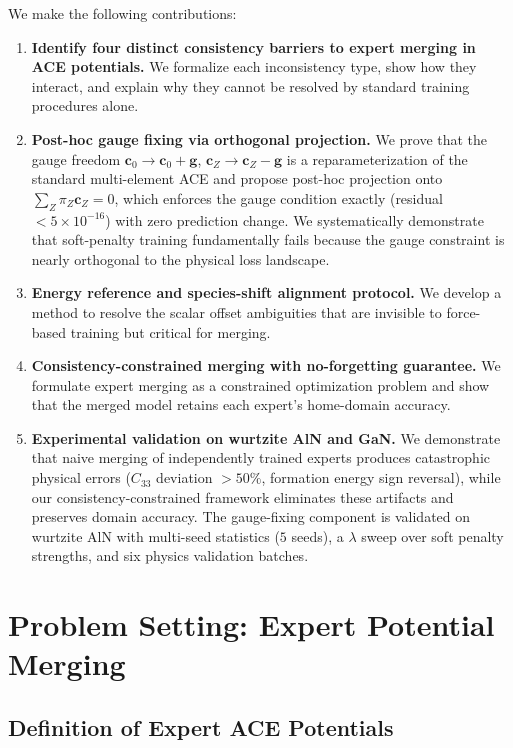\documentclass[twoside,prb,aps,floatfix,superscriptaddress,longbibliography]{revtex4-2}
\newcommand{\g}{\mathbf{g}}
\newcommand{\cZ}{\mathbf{c}_{Z}}
\newcommand{\cb}{\mathbf{c}_{0}}
\begin{document}
We make the following contributions:

\begin{enumerate}[label=\textbf{(C\arabic*)}]
    \item \textbf{Identify four distinct consistency barriers to expert merging in ACE potentials.} We formalize each inconsistency type, show how they interact, and explain why they cannot be resolved by standard training procedures alone.
    \item \textbf{Post-hoc gauge fixing via orthogonal projection.} We prove that the gauge freedom $\cb \to \cb + \g$, $\cZ \to \cZ - \g$ is a reparameterization of the standard multi-element ACE and propose post-hoc projection onto $\sum_Z \pi_Z \cZ = 0$, which enforces the gauge condition exactly (residual $< 5\times10^{-16}$) with zero prediction change. We systematically demonstrate that soft-penalty training fundamentally fails because the gauge constraint is nearly orthogonal to the physical loss landscape.
    \item \textbf{Energy reference and species-shift alignment protocol.} We develop a method to resolve the scalar offset ambiguities that are invisible to force-based training but critical for merging.
    \item \textbf{Consistency-constrained merging with no-forgetting guarantee.} We formulate expert merging as a constrained optimization problem and show that the merged model retains each expert's home-domain accuracy.
    \item \textbf{Experimental validation on wurtzite AlN and GaN.} We demonstrate that naive merging of independently trained experts produces catastrophic physical errors ($C_{33}$ deviation $>50\%$, formation energy sign reversal), while our consistency-constrained framework eliminates these artifacts and preserves domain accuracy. The gauge-fixing component is validated on wurtzite AlN with multi-seed statistics ($5$ seeds), a $\lambda$ sweep over soft penalty strengths, and six physics validation batches.
\end{enumerate}

\section{Problem Setting: Expert Potential Merging}
\label{sec:problem}

\subsection{Definition of Expert ACE Potentials}
\end{document}
